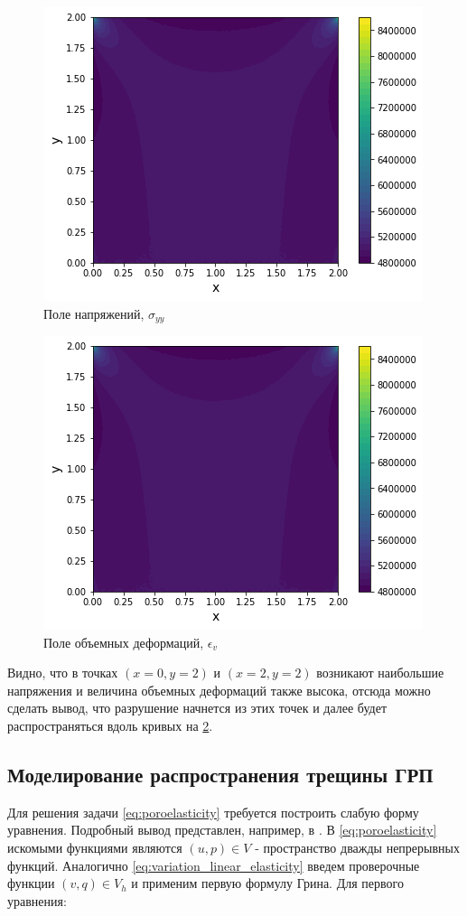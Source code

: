 \begin{figure}
	\centering
	\includegraphics[width=0.65 \textwidth]{images/part2/sigma_yy_1.png}
	\caption{Поле напряжений, $\sigma_{yy}$}
	\label{fig:sigma_y_1}
\end{figure}

\begin{figure}
	\centering
	\includegraphics[width=0.65 \textwidth]{images/part2/sigma_yy_1.png}
	\caption{Поле объемных деформаций, $\epsilon_v$}
	\label{fig:epsilon_v}
\end{figure}

Видно, что в точках $(x = 0, y = 2)$ и $(x = 2, y = 2)$ возникают наибольшие напряжения и величина объемных деформаций также высока, отсюда можно сделать вывод, что разрушение начнется из этих точек и далее будет распространяться вдоль кривых на \ref{fig:epsilon_v}.

\subsection*{Моделирование распространения трещины ГРП}
Для решения задачи \eqref{eq:poroelasticity} требуется построить слабую форму уравнения. Подробный вывод представлен, например, в \cite{osti_1592387}.  В \eqref{eq:poroelasticity} искомыми функциями являются $(u, p) \in V$ - пространство дважды непрерывных функций. Аналогично \eqref{eq:variation_linear_elasticity} введем проверочные функции $(v, q) \in V_h $ и применим первую формулу Грина. Для первого уравнения:

